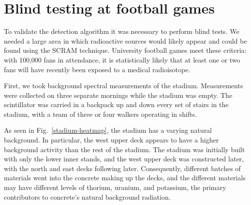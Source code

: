 \section{Blind testing at football games}\label{football}

To validate the detection algorithm it was necessary to perform blind
tests. We needed a large area in which radioactive sources would likely appear
and could be found using the SCRAM technique. University football games meet
these criteria: with 100,000 fans in attendance, it is statistically likely that
at least one or two fans will have recently been exposed to a medical
radioisotope.

First, we took background spectral measurements of the stadium. Measurements
were collected on three separate mornings while the stadium was empty. The
scintillator was carried in a backpack up and down every set of stairs in the
stadium, with a team of three or four walkers operating in shifts.

As seen in Fig.~\ref{stadium-heatmap}, the stadium has a varying natural
background. In particular, the west upper deck appears to have a higher
background activity than the rest of the stadium. The stadium was initially
built with only the lower inner stands, and the west upper deck was constructed
later, with the north and east decks following later. Consequently, different
batches of materials went into the concrete making up the decks, and the
different materials may have different levels of thorium, uranium, and
potassium, the primary contributors to concrete's natural background radiation.

